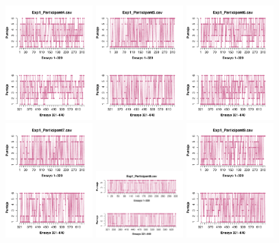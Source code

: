\begin{figure}[th]
\includegraphics[width=0.30\textwidth]{Figures/Rating_Exp1_P4} \includegraphics[width=0.30\textwidth]{Figures/Rating_Exp1_P5} \includegraphics[width=0.30\textwidth]{Figures/Rating_Exp1_P6}
\includegraphics[width=0.30\textwidth]{Figures/Rating_Exp1_P7} \includegraphics[width=0.30\textwidth]{Figures/Rating_Exp1_P8} \includegraphics[width=0.30\textwidth]{Figures/Rating_Exp1_P9}

\end{figure}
